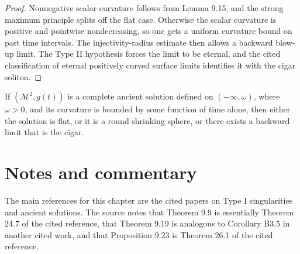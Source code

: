 \begin{proof}
Nonnegative scalar curvature follows from Lemma 9.15, and the strong maximum principle splits off the flat case. Otherwise the scalar curvature is positive and pointwise nondecreasing, so one gets a uniform curvature bound on past time intervals. The injectivity-radius estimate then allows a backward blow-up limit. The Type II hypothesis forces the limit to be eternal, and the cited classification of eternal positively curved surface limits identifies it with the cigar soliton.
\end{proof}

\begin{corollary}
\label{ch09-cor-ancient-surface-classification}
If \((\mathcal M^2,g(t))\) is a complete ancient solution defined on \((-\infty,\omega)\), where \(\omega>0\), and its curvature is bounded by some function of time alone, then either the solution is flat, or it is a round shrinking sphere, or there exists a backward limit that is the cigar.
\end{corollary}

\section*{Notes and commentary}

\begin{remark}
\label{ch09-rem-notes-and-commentary}
The main references for this chapter are the cited papers on Type I singularities and ancient solutions. The source notes that Theorem 9.9 is essentially Theorem 24.7 of the cited reference, that Theorem 9.19 is analogous to Corollary B3.5 in another cited work, and that Proposition 9.23 is Theorem 26.1 of the cited reference.
\end{remark}
